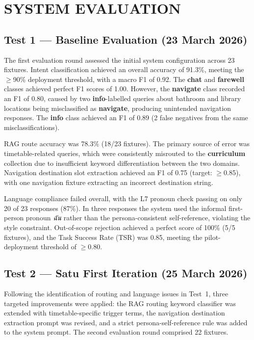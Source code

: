 \section{SYSTEM EVALUATION}

\subsection{Test 1 — Baseline Evaluation (23 March 2026)}

The first evaluation round assessed the initial system configuration across 23 fixtures. Intent classification achieved an overall accuracy of 91.3\%, meeting the $\geq$90\% deployment threshold, with a macro F1 of 0.92. The \textbf{chat} and \textbf{farewell} classes achieved perfect F1 scores of 1.00. However, the \textbf{navigate} class recorded an F1 of 0.80, caused by two \textbf{info}-labelled queries about bathroom and library locations being misclassified as \textbf{navigate}, producing unintended navigation responses. The \textbf{info} class achieved an F1 of 0.89 (2 false negatives from the same misclassifications).

RAG route accuracy was 78.3\% (18/23 fixtures). The primary source of error was timetable-related queries, which were consistently misrouted to the \textbf{curriculum} collection due to insufficient keyword differentiation between the two domains. Navigation destination slot extraction achieved an F1 of 0.75 (target: $\geq$0.85), with one navigation fixture extracting an incorrect destination string.

Language compliance failed overall, with the L7 pronoun check passing on only 20 of 23 responses (87\%). In three responses the system used the informal first-person pronoun \textit{ฉัน} rather than the persona-consistent self-reference, violating the style constraint. Out-of-scope rejection achieved a perfect score of 100\% (5/5 fixtures), and the Task Success Rate (TSR) was 0.85, meeting the pilot-deployment threshold of $\geq$0.80.

\subsection{Test 2 — Satu First Iteration (25 March 2026)}

Following the identification of routing and language issues in Test~1, three targeted improvements were applied: the RAG routing keyword classifier was extended with timetable-specific trigger terms, the navigation destination extraction prompt was revised, and a strict persona-self-reference rule was added to the system prompt. The second evaluation round comprised 22 fixtures.

